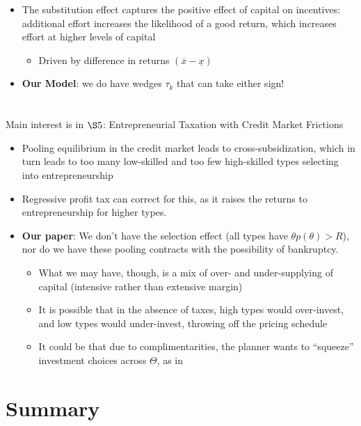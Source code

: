 \documentclass[11pt]{article}
\begin{document}
\begin{itemize}
\begin{itemize}
    \end{itemize} 
    \item The substitution effect captures the positive effect of capital on incentives: additional effort increases the likelihood of a good return, which increases effort at higher levels of capital
    \begin{itemize}
        \item Driven by difference in returns \( \left(\overline{x}-\underline{x}\right) \)
    \end{itemize} 
    \item \textbf{Our Model}: we do have wedges \( \tau_k \) that can take either sign!
\end{itemize}
\section{\cite{scheuer2014entrepreneurial}}
Main interest is in \( \S 5 \): Entrepreneurial Taxation with Credit Market Frictions
\begin{itemize}
    \item Pooling equilibrium in the credit market leads to cross-subsidization, which in turn leads to too many low-skilled and too few high-skilled types selecting into entrepreneurship 
    \item Regressive profit tax can correct for this, as it raises the returns to entrepreneurship for higher types. 
    \item \textbf{Our paper}: We don't have the selection effect (all types have \( \theta p(\theta) > R\)), nor do we have these pooling contracts with the possibility of bankruptcy. 
    \begin{itemize}
        \item What we may have, though, is a mix of over- and under-supplying of capital (intensive rather than extensive margin) 
        \item It is possible that in the absence of taxes, high types would over-invest, and low types would under-invest, throwing off the pricing schedule 
        \item It could be that due to complimentarities, the planner wants to ``squeeze'' investment choices across \( \Theta \), as in \cite{farhi2010progressive}
    \end{itemize}
\end{itemize}

\section{Summary}
\end{document}
